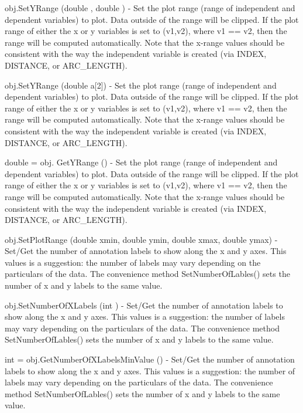 \begin{DoxyItemize}
\item {\ttfamily obj.\-Set\-Y\-Range (double , double )} -\/ Set the plot range (range of independent and dependent variables) to plot. Data outside of the range will be clipped. If the plot range of either the x or y variables is set to (v1,v2), where v1 == v2, then the range will be computed automatically. Note that the x-\/range values should be consistent with the way the independent variable is created (via I\-N\-D\-E\-X, D\-I\-S\-T\-A\-N\-C\-E, or A\-R\-C\-\_\-\-L\-E\-N\-G\-T\-H).  
\item {\ttfamily obj.\-Set\-Y\-Range (double a\mbox{[}2\mbox{]})} -\/ Set the plot range (range of independent and dependent variables) to plot. Data outside of the range will be clipped. If the plot range of either the x or y variables is set to (v1,v2), where v1 == v2, then the range will be computed automatically. Note that the x-\/range values should be consistent with the way the independent variable is created (via I\-N\-D\-E\-X, D\-I\-S\-T\-A\-N\-C\-E, or A\-R\-C\-\_\-\-L\-E\-N\-G\-T\-H).  
\item {\ttfamily double = obj. Get\-Y\-Range ()} -\/ Set the plot range (range of independent and dependent variables) to plot. Data outside of the range will be clipped. If the plot range of either the x or y variables is set to (v1,v2), where v1 == v2, then the range will be computed automatically. Note that the x-\/range values should be consistent with the way the independent variable is created (via I\-N\-D\-E\-X, D\-I\-S\-T\-A\-N\-C\-E, or A\-R\-C\-\_\-\-L\-E\-N\-G\-T\-H).  
\item {\ttfamily obj.\-Set\-Plot\-Range (double xmin, double ymin, double xmax, double ymax)} -\/ Set/\-Get the number of annotation labels to show along the x and y axes. This values is a suggestion\-: the number of labels may vary depending on the particulars of the data. The convenience method Set\-Number\-Of\-Lables() sets the number of x and y labels to the same value.  
\item {\ttfamily obj.\-Set\-Number\-Of\-X\-Labels (int )} -\/ Set/\-Get the number of annotation labels to show along the x and y axes. This values is a suggestion\-: the number of labels may vary depending on the particulars of the data. The convenience method Set\-Number\-Of\-Lables() sets the number of x and y labels to the same value.  
\item {\ttfamily int = obj.\-Get\-Number\-Of\-X\-Labels\-Min\-Value ()} -\/ Set/\-Get the number of annotation labels to show along the x and y axes. This values is a suggestion\-: the number of labels may vary depending on the particulars of the data. The convenience method Set\-Number\-Of\-Lables() sets the number of x and y labels to the same value.  

\end{DoxyItemize}
